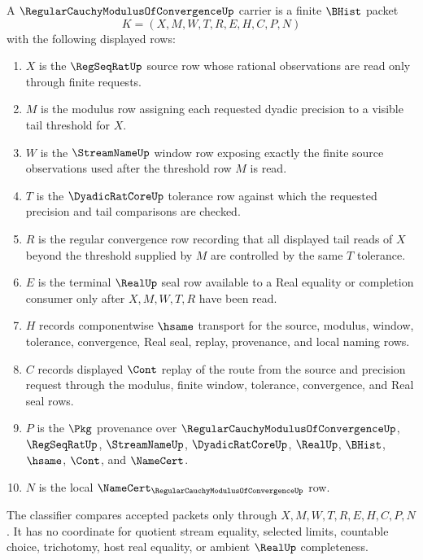 \begin{definition}
\label{def:regular-cauchy-modulus-of-convergence-carrier}
A $\RegularCauchyModulusOfConvergenceUp$ carrier is a finite $\BHist$ packet
$$
K=(X,M,W,T,R,E,H,C,P,N)
$$
with the following displayed rows:
\begin{enumerate}
\item $X$ is the $\RegSeqRatUp$ source row whose rational observations are read only through finite requests.
\item $M$ is the modulus row assigning each requested dyadic precision to a visible tail threshold for $X$.
\item $W$ is the $\StreamNameUp$ window row exposing exactly the finite source observations used after the threshold row $M$ is read.
\item $T$ is the $\DyadicRatCoreUp$ tolerance row against which the requested precision and tail comparisons are checked.
\item $R$ is the regular convergence row recording that all displayed tail reads of $X$ beyond the threshold supplied by $M$ are controlled by the same $T$ tolerance.
\item $E$ is the terminal $\RealUp$ seal row available to a Real equality or completion consumer only after $X,M,W,T,R$ have been read.
\item $H$ records componentwise $\hsame$ transport for the source, modulus, window, tolerance, convergence, Real seal, replay, provenance, and local naming rows.
\item $C$ records displayed $\Cont$ replay of the route from the source and precision request through the modulus, finite window, tolerance, convergence, and Real seal rows.
\item $P$ is the $\Pkg$ provenance over $\RegularCauchyModulusOfConvergenceUp$, $\RegSeqRatUp$, $\StreamNameUp$, $\DyadicRatCoreUp$, $\RealUp$, $\BHist$, $\hsame$, $\Cont$, and $\NameCert$.
\item $N$ is the local $\NameCert_{\RegularCauchyModulusOfConvergenceUp}$ row.
\end{enumerate}
The classifier compares accepted packets only through $X,M,W,T,R,E,H,C,P,N$. It has no coordinate for quotient stream equality, selected limits, countable choice, trichotomy, host real equality, or ambient $\RealUp$ completeness.
\end{definition}

